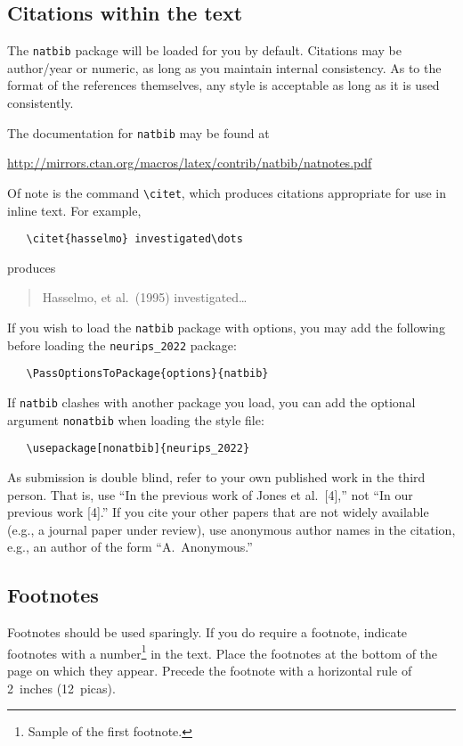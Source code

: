 \documentclass{article}
\begin{document}
\subsection{Citations within the text}

The \verb+natbib+ package will be loaded for you by default.  Citations may be
author/year or numeric, as long as you maintain internal
consistency.  As to the
format of the references themselves, any style is acceptable as long as it is
used consistently.

The documentation for \verb+natbib+ may be found at
\begin{center}
  \url{http://mirrors.ctan.org/macros/latex/contrib/natbib/natnotes.pdf}
\end{center}
Of note is the command \verb+\citet+, which produces citations appropriate for
use in inline text.  For example,
\begin{verbatim}
   \citet{hasselmo} investigated\dots
\end{verbatim}
produces
\begin{quote}
  Hasselmo, et al.\ (1995) investigated\dots
\end{quote}

If you wish to load the \verb+natbib+ package with options, you may add the
following before loading the \verb+neurips_2022+ package:
\begin{verbatim}
   \PassOptionsToPackage{options}{natbib}
\end{verbatim}

If \verb+natbib+ clashes with another package you load, you can add
the optional
argument \verb+nonatbib+ when loading the style file:
\begin{verbatim}
   \usepackage[nonatbib]{neurips_2022}
\end{verbatim}

As submission is double blind, refer to your own published work in the third
person. That is, use ``In the previous work of Jones et al.\ [4],''
not ``In our
previous work [4].'' If you cite your other papers that are not
widely available
(e.g., a journal paper under review), use anonymous author names in the
citation, e.g., an author of the form ``A.\ Anonymous.''

\subsection{Footnotes}

Footnotes should be used sparingly.  If you do require a footnote, indicate
footnotes with a number\footnote{Sample of the first footnote.} in the
text. Place the footnotes at the bottom of the page on which they appear.
Precede the footnote with a horizontal rule of 2~inches (12~picas).
\end{document}
